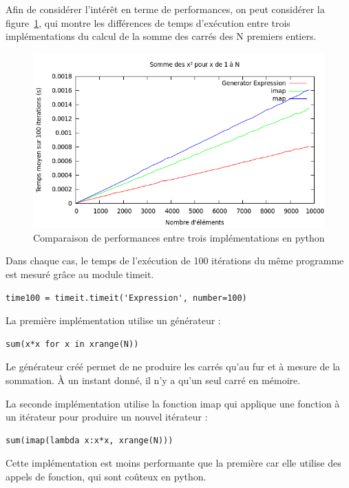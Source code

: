\documentclass[a4paper]{article}
\begin{document}
Afin de considérer l'intérêt en terme de performances, on peut
considérer la figure~\ref{GenExpMapImapPy}, qui montre les différences
de temps d'exécution entre trois implémentations du calcul de la somme
des carrés des N premiers entiers.

\begin{figure}[h]
  \includegraphics[scale=1]{./Pictures/GenExpMapImapPy}
  \caption{Comparaison de performances entre trois implémentations en python}
  \label{GenExpMapImapPy}
\end{figure}

Dans chaque cas, le temps de l'exécution de 100 itérations du même
programme est mesuré grâce au module timeit.

\begin{verbatim}
time100 = timeit.timeit('Expression', number=100)
\end{verbatim}

La première implémentation utilise un générateur :

\begin{verbatim}
sum(x*x for x in xrange(N))
\end{verbatim}

Le générateur créé permet de ne produire les carrés qu'au fur et à
mesure de la sommation. À un instant donné, il n'y a qu'un seul carré
en mémoire.


La seconde implémentation utilise la fonction imap qui applique une
fonction à un itérateur pour produire un nouvel itérateur :

\begin{verbatim}
sum(imap(lambda x:x*x, xrange(N)))
\end{verbatim}

Cette implémentation est moins performante que la première car elle
utilise des appels de fonction, qui sont coûteux en python.
\end{document}
